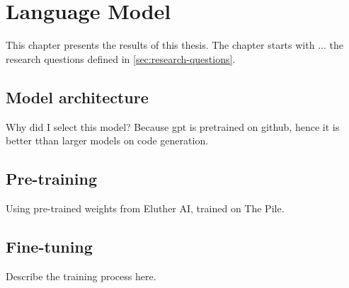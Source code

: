 \chapter{Language Model}
\label{chap:architecture}
This chapter presents the results of this thesis. The chapter starts with ... the research questions defined in \cref{sec:research-questions}.

\section{Model architecture}
\label{sec:architecture}

Why did I select this model? Because gpt is pretrained on github, hence it is better tthan larger models on code generation.

\section{Pre-training}
\label{sec:pretraining}
Using pre-trained weights from Eluther AI, trained on The Pile.

\section{Fine-tuning}
\label{sec:fine-tuning}

Describe the training process here.

